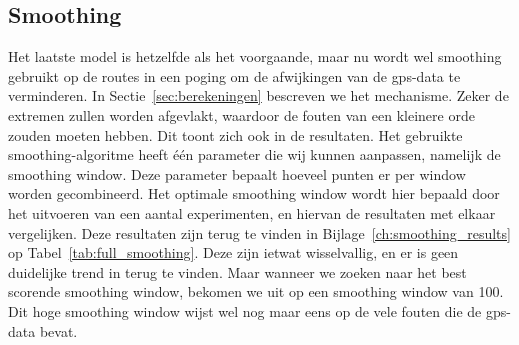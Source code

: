\subsection{Smoothing}
Het laatste model is hetzelfde als het voorgaande, maar nu wordt wel smoothing
gebruikt op de routes in een poging om de afwijkingen van de \ac{gps}-data te
verminderen. In Sectie~\ref{sec:berekeningen} bescreven we het mechanisme.
Zeker de extremen zullen worden afgevlakt, waardoor de fouten van een kleinere
orde zouden moeten hebben. Dit toont zich ook in de resultaten. Het gebruikte
smoothing-algoritme heeft één parameter die wij kunnen aanpassen, namelijk de
smoothing window. Deze parameter bepaalt hoeveel punten er per window worden
gecombineerd. Het optimale smoothing window wordt hier bepaald door het
uitvoeren van een aantal experimenten, en hiervan de resultaten met elkaar
vergelijken. Deze resultaten zijn terug te vinden in
Bijlage~\ref{ch:smoothing_results} op Tabel~\ref{tab:full_smoothing}. Deze zijn
ietwat wisselvallig, en er is geen duidelijke trend in terug te vinden.
Maar wanneer we zoeken naar het best scorende smoothing window, bekomen we uit
op een smoothing window van 100. Dit hoge smoothing window wijst wel nog maar
eens op de vele fouten die de \ac{gps}-data bevat.

